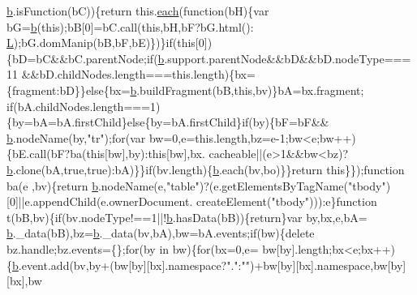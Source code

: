 \begin{DoxyCode}
      \hyperlink{jquery_8js_aa4026ad5544b958e54ce5e106fa1c805}{b}.isFunction(bC))\{\textcolor{keywordflow}{return} this.\hyperlink{jquery_8js_a871ff39db627c54c710a3e9909b8234c}{each}(\textcolor{keyword}{function}(bH)\{var bG=\hyperlink{jquery_8js_aa4026ad5544b958e54ce5e106fa1c805}{b}(\textcolor{keyword}{this});bB[0]=bC.call(\textcolor{keyword}{this},bH,bF?bG.html():
      \hyperlink{jquery_8js_a38ee4c0b5f4fe2a18d0c783af540d253}{L});bG.domManip(bB,bF,bE)\})\}\textcolor{keywordflow}{if}(\textcolor{keyword}{this}[0])\{bD=bC&&bC.parentNode;\textcolor{keywordflow}{if}(\hyperlink{jquery_8js_aa4026ad5544b958e54ce5e106fa1c805}{b}.support.parentNode&&bD&&bD.nodeType===11
      &&bD.childNodes.length===\textcolor{keyword}{this}.length)\{bx=\{fragment:bD\}\}\textcolor{keywordflow}{else}\{bx=\hyperlink{jquery_8js_aa4026ad5544b958e54ce5e106fa1c805}{b}.buildFragment(bB,\textcolor{keyword}{this},bv)\}bA=bx.fragment;\textcolor{keywordflow}{
      if}(bA.childNodes.length===1)\{by=bA=bA.firstChild\}\textcolor{keywordflow}{else}\{by=bA.firstChild\}\textcolor{keywordflow}{if}(by)\{bF=bF&&
      \hyperlink{jquery_8js_aa4026ad5544b958e54ce5e106fa1c805}{b}.nodeName(by,\textcolor{stringliteral}{"tr"});\textcolor{keywordflow}{for}(var bw=0,e=this.length,bz=e-1;bw<e;bw++)\{bE.call(bF?ba(\textcolor{keyword}{this}[bw],by):\textcolor{keyword}{this}[bw],bx.
      cacheable||(e>1&&bw<bz)?\hyperlink{jquery_8js_aa4026ad5544b958e54ce5e106fa1c805}{b}.clone(bA,\textcolor{keyword}{true},\textcolor{keyword}{true}):bA)\}\}\textcolor{keywordflow}{if}(bv.length)\{\hyperlink{jquery_8js_aa4026ad5544b958e54ce5e106fa1c805}{b}.each(bv,bo)\}\}\textcolor{keywordflow}{return} \textcolor{keyword}{this}\}\});\textcolor{keyword}{function} ba(e
      ,bv)\{\textcolor{keywordflow}{return} \hyperlink{jquery_8js_aa4026ad5544b958e54ce5e106fa1c805}{b}.nodeName(e,\textcolor{stringliteral}{"table"})?(e.getElementsByTagName(\textcolor{stringliteral}{"tbody"})[0]||e.appendChild(e.ownerDocument.
      createElement(\textcolor{stringliteral}{"tbody"}))):e\}\textcolor{keyword}{function} t(bB,bv)\{\textcolor{keywordflow}{if}(bv.nodeType!==1||!\hyperlink{jquery_8js_aa4026ad5544b958e54ce5e106fa1c805}{b}.hasData(bB))\{\textcolor{keywordflow}{return}\}var by,bx,e,bA=
      \hyperlink{jquery_8js_aa4026ad5544b958e54ce5e106fa1c805}{b}.\_data(bB),bz=\hyperlink{jquery_8js_aa4026ad5544b958e54ce5e106fa1c805}{b}.\_data(bv,bA),bw=bA.events;\textcolor{keywordflow}{if}(bw)\{\textcolor{keyword}{delete} bz.handle;bz.events=\{\};\textcolor{keywordflow}{for}(by in bw)\{\textcolor{keywordflow}{for}(bx=0,e=
      bw[by].length;bx<e;bx++)\{\hyperlink{jquery_8js_aa4026ad5544b958e54ce5e106fa1c805}{b}.event.add(bv,by+(bw[by][bx].\textcolor{keyword}{namespace}?\textcolor{stringliteral}{"."}:\textcolor{stringliteral}{""})+bw[by][bx].\textcolor{keyword}{namespace},bw[by][bx],bw

\end{DoxyCode}
